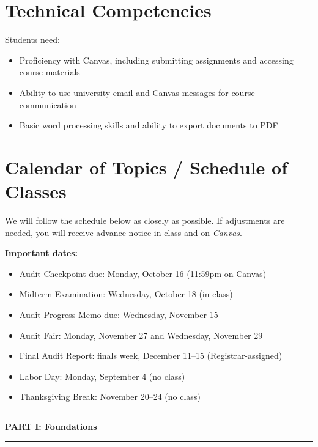 \documentclass[12pt]{article}
\begin{document}
\section*{Technical Competencies}
Students need:
\begin{itemize}
\item Proficiency with Canvas, including submitting assignments and accessing course materials
\item Ability to use university email and Canvas messages for course communication
\item Basic word processing skills and ability to export documents to PDF
\end{itemize}

\section*{Calendar of Topics / Schedule of Classes}

We will follow the schedule below as closely as possible. If adjustments are needed, you will receive advance notice in class and on \emph{Canvas}.

\vspace{0.5em}
\noindent \textbf{Important dates:}
\begin{itemize}
    \item Audit Checkpoint due: Monday, October 16 (11:59pm on Canvas)
    \item Midterm Examination: Wednesday, October 18 (in-class)
    \item Audit Progress Memo due: Wednesday, November 15
    \item Audit Fair: Monday, November 27 and Wednesday, November 29
    \item Final Audit Report: finals week, December 11--15 (Registrar-assigned)
    \item Labor Day: Monday, September 4 (no class)
    \item Thanksgiving Break: November 20--24 (no class)
\end{itemize}

\bigskip

\noindent\rule{\textwidth}{0.6pt}
\begin{center}\textbf{PART I: Foundations}\end{center}
\noindent\rule{\textwidth}{0.6pt}
\end{document}
